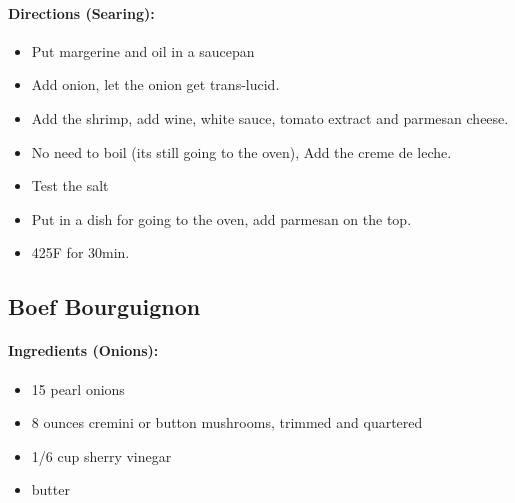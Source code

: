 \documentclass{article}
\begin{document}
\paragraph{Directions (Searing):}
\begin{itemize}
    \item Put margerine and oil in a saucepan
    \item Add onion, let the onion get trans-lucid.
    \item Add the shrimp, add wine, white sauce, tomato extract and parmesan cheese.
    \item No need to boil (its still going to the oven), Add the creme de leche.
    \item Test the salt
    \item Put in a dish for going to the oven, add parmesan on the top.
    \item 425F for 30min.
\end{itemize} 

\subsection{Boef Bourguignon} 

\paragraph{Ingredients (Onions):}
\begin{itemize}
    \item 15 pearl onions
    \item 8 ounces cremini or button mushrooms, trimmed and quartered
    \item 1/6 cup sherry vinegar
    \item butter
\end{itemize}  
\end{document}
